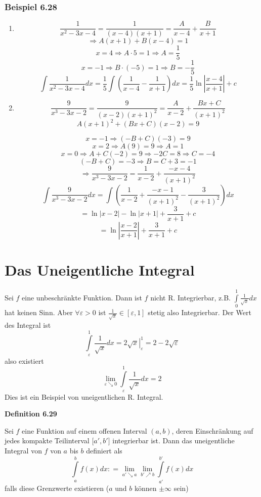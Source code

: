 \subsubsection*{Beispiel 6.28}
\begin{enumerate}
\item $$\frac{1}{x^2 -3x -4}=\frac{1}{(x-4)(x+1)}=\frac{A}{x-4}+\frac{B}{x+1}$$
$$\Rightarrow A(x+1)+B(x-4)=1$$
$$x=4\Rightarrow A\cdot 5=1\Rightarrow A=\frac{1}{5}$$
$$x=-1\Rightarrow B\cdot (-5)=1\Rightarrow B=-\frac{1}{5}$$
\[\int {\frac{1}{{{x^2} - 3x - 4}}dx = \frac{1}{5}\int {\left( {\frac{1}{{x - 4}} - \frac{1}{{x + 1}}} \right)dx = \frac{1}{5}} } \ln \left| {\frac{{x - 4}}{{x + 1}}} \right| + c\]
\item \[\frac{9}{{{x^3} - 3x - 2}} = \frac{9}{{(x - 2){{(x + 1)}^2}}} = \frac{A}{{x - 2}} + \frac{{Bx + C}}{{{{(x + 1)}^2}}}\]
\[A{(x + 1)^2} + (Bx + C)(x - 2) = 9\]

$$x=-1\Rightarrow(-B+C)(-3)=9$$
$$x=2\Rightarrow A(9)=9\Rightarrow A=1$$
$$x=0\Rightarrow A+C(-2)=9\Rightarrow -2C=8\Rightarrow C=-4$$
$$(-B+C)=-3\Rightarrow B=C+3=-1$$
$$\Rightarrow \frac{9}{x^3-3x-2}=\frac{1}{x-2}+\frac{-x-4}{(x+1)^2}$$
\[\int {\frac{9}{{{x^3} - 3x - 2}}dx = \int {\left( {\frac{1}{{x - 2}} + \frac{{ - x - 1}}{{{{(x + 1)}^2}}} - \frac{3}{{{{(x + 1)}^2}}}} \right)dx} } \]
\[ = \ln \left| {x - 2} \right| - \ln \left| {x + 1} \right| + \frac{3}{{x + 1}} + c\]
\[ = \ln \left| {\frac{{x - 2}}{{x + 1}}} \right| + \frac{3}{{x + 1}} + c\]
\end{enumerate}
\section{Das Uneigentliche Integral}
Sei $f$ eine unbeschränkte Funktion. Dann ist $f$ nicht R. Integrierbar, z.B. $\int\limits_0^1 {\frac{1}{{\sqrt x }}} dx$ hat keinen Sinn. Aber $\forall\varepsilon>0$ ist $\frac{1}{\sqrt{x}}\in\left[\varepsilon,1 \right]$ stetig also Integrierbar. Der Wert des Integral ist \[\int\limits_\varepsilon ^1 {\frac{1}{{\sqrt x }}} dx = \left. {2\sqrt x } \right|_\varepsilon ^1 = 2 - 2\sqrt \varepsilon  \] also existiert \[\mathop {\lim }\limits_{\varepsilon  \searrow 0} \int\limits_\varepsilon ^1 {\frac{1}{{\sqrt x }}} dx = 2\] Dies ist ein Beispiel von uneigentlichen R. Integral.

\begin{framed}
\centerline{\textbf{Definition 6.29}}
\noindent Sei $f$ eine Funktion auf einem offenen Interval $(a,b)$, deren Einschränkung auf jedes kompakte Teilinterval $\lbrack a',b'\rbrack$ integrierbar ist. Dann das uneigentliche Integral von $f$ von $a$ bis $b$ definiert als \[\int\limits_a^b {f(x)dx: = \mathop {\lim }\limits_{a' \searrow a} \mathop {\lim }\limits_{b' \nearrow b} } \int\limits_{a'}^{b'} {f(x)dx} \] falls diese Grenzwerte existieren ($a$ und $b$ können $\pm \infty$ sein)
\end{framed}

